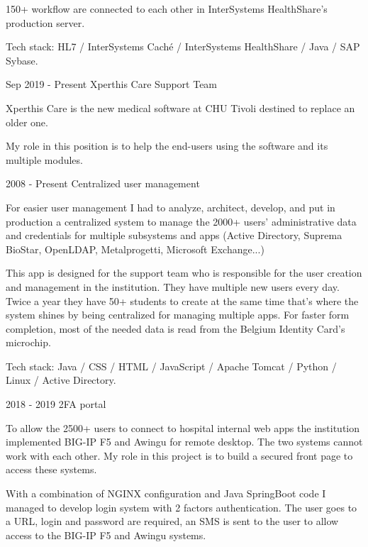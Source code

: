 \begin{cventries}
{150+ workflow are connected to each other in InterSystems HealthShare's production server.

Tech stack: HL7 / InterSystems Caché / InterSystems HealthShare / Java / SAP Sybase.

    }
    
    
  \cventry
    {Sep 2019 - Present} %
    {Xperthis Care Support Team} %
    {} %
    {} %
    {
Xperthis Care is the new medical software at CHU Tivoli destined to replace an older one.

My role in this position is to help the end-users using the software and its multiple modules.

    }
    
  \cventry
    {2008 - Present} %
    {Centralized user management} %
    {} %
    {} %
    {
For easier user management I had to analyze, architect, develop, and put in production a centralized system to manage the 2000+ users' administrative data and credentials for multiple subsystems and apps (Active Directory, Suprema BioStar, OpenLDAP, Metalprogetti, Microsoft Exchange...)

This app is designed for the support team who is responsible for the user creation and management in the institution. They have multiple new users every day. Twice a year they have 50+ students to create at the same time that's where the system shines by being centralized for managing multiple apps.
For faster form completion, most of the needed data is read from the Belgium Identity Card's microchip.

Tech stack: Java / CSS / HTML / JavaScript / Apache Tomcat / Python / Linux / Active Directory.

    }
    
    
  \cventry
    {2018 - 2019} %
    {2FA portal} %
    {} %
    {} %
    {
To allow the 2500+ users to connect to hospital internal web apps the institution implemented BIG-IP F5 and Awingu for remote desktop. 
The two systems cannot work with each other.
My role in this project is to build a secured front page to access these systems.

With a combination of NGINX configuration and Java SpringBoot code I managed to develop login system with 2 factors authentication. The user goes to a URL, login and password are required, an SMS is sent to the user to allow access to the BIG-IP F5 and Awingu systems. 

}
\end{cventries}
